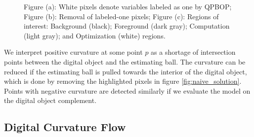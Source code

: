 \documentclass[runningheads]{llncs}
\begin{document}
	\begin{figure}[!ht]
		\center
		\hspace{40pt}
		\hspace{40pt}
		\caption{Figure (a): White pixels denote variables labeled as one by QPBOP; Figure (b): Removal of labeled-one pixels; Figure (c): Regions of interest: Background (black); Foreground (dark gray); Computation (light gray); and Optimization (white) regions.}	
					
	\end{figure}

        We interpret positive curvature at some point $p$ as a shortage of intersection points between the digital object
        and the estimating ball. The curvature can be reduced if the estimating ball is pulled towards the interior of the
        digital object, which is done by removing the highlighted pixels in figure \ref{fig:naive_solution}. Points with
        negative curvature are detected similarly if we evaluate the model on the digital object complement.

\subsection{Digital Curvature Flow}
\end{document}
